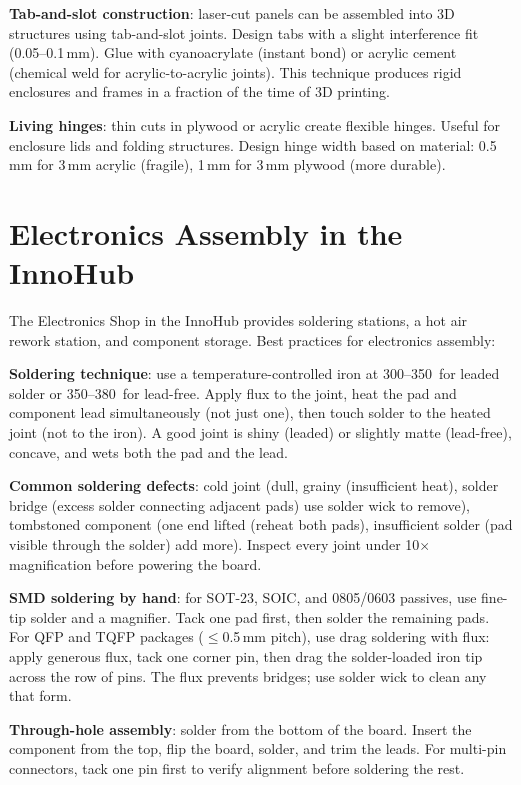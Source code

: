 \textbf{Tab-and-slot construction}: laser-cut panels can be assembled into 3D structures using tab-and-slot joints. Design tabs with a slight interference fit (0.05--0.1\,mm). Glue with cyanoacrylate (instant bond) or acrylic cement (chemical weld for acrylic-to-acrylic joints). This technique produces rigid enclosures and frames in a fraction of the time of 3D printing.

\textbf{Living hinges}: thin cuts in plywood or acrylic create flexible hinges. Useful for enclosure lids and folding structures. Design hinge width based on material: 0.5\,mm for 3\,mm acrylic (fragile), 1\,mm for 3\,mm plywood (more durable).



\section{Electronics Assembly in the InnoHub}
The Electronics Shop in the InnoHub provides soldering stations, a hot air rework station, and component storage. Best practices for electronics assembly:

\textbf{Soldering technique}: use a temperature-controlled iron at 300--350\,\degC{} for leaded solder or 350--380\,\degC{} for lead-free. Apply flux to the joint, heat the pad and component lead simultaneously (not just one), then touch solder to the heated joint (not to the iron). A good joint is shiny (leaded) or slightly matte (lead-free), concave, and wets both the pad and the lead.

\textbf{Common soldering defects}: cold joint (dull, grainy (insufficient heat), solder bridge (excess solder connecting adjacent pads) use solder wick to remove), tombstoned component (one end lifted (reheat both pads), insufficient solder (pad visible through the solder) add more). Inspect every joint under 10$\times$ magnification before powering the board.

\textbf{SMD soldering by hand}: for SOT-23, SOIC, and 0805/0603 passives, use fine-tip solder and a magnifier. Tack one pad first, then solder the remaining pads. For QFP and TQFP packages ($\leq$0.5\,mm pitch), use drag soldering with flux: apply generous flux, tack one corner pin, then drag the solder-loaded iron tip across the row of pins. The flux prevents bridges; use solder wick to clean any that form.

\textbf{Through-hole assembly}: solder from the bottom of the board. Insert the component from the top, flip the board, solder, and trim the leads. For multi-pin connectors, tack one pin first to verify alignment before soldering the rest.

